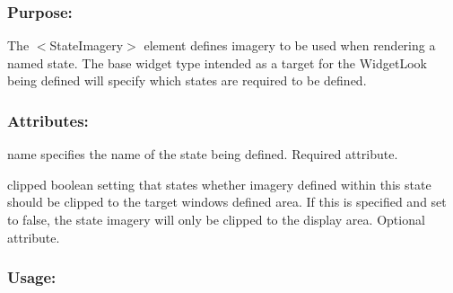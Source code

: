 \hypertarget{fal_element_ref_fal_elem_ref_sec_30_1}{}\subsubsection{Purpose\+:}\label{fal_element_ref_fal_elem_ref_sec_30_1}
The {\ttfamily $<$State\+Imagery$>$} element defines imagery to be used when rendering a named state. The base widget type intended as a target for the Widget\+Look being defined will specify which states are required to be defined.\hypertarget{fal_element_ref_fal_elem_ref_sec_30_2}{}\subsubsection{Attributes\+:}\label{fal_element_ref_fal_elem_ref_sec_30_2}
\begin{DoxyItemize}
\item {\ttfamily name} specifies the name of the state being defined. Required attribute. \item {\ttfamily clipped} boolean setting that states whether imagery defined within this state should be clipped to the target window\textquotesingle{}s defined area. If this is specified and set to false, the state imagery will only be clipped to the display area. Optional attribute.\end{DoxyItemize}
\hypertarget{fal_element_ref_fal_elem_ref_sec_30_3}{}\subsubsection{Usage\+:}\label{fal_element_ref_fal_elem_ref_sec_30_3}

